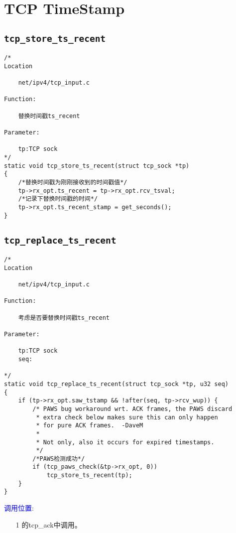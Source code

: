 \section{TCP TimeStamp}
    \subsection{\texttt{tcp_store_ts_recent}}
\begin{verbatim}
/*
Location

    net/ipv4/tcp_input.c

Function:

    替换时间戳ts_recent

Parameter:

    tp:TCP sock
*/
static void tcp_store_ts_recent(struct tcp_sock *tp)
{
    /*替换时间戳为刚刚接收到的时间戳值*/
    tp->rx_opt.ts_recent = tp->rx_opt.rcv_tsval;
    /*记录下替换时间戳的时间*/
    tp->rx_opt.ts_recent_stamp = get_seconds();
}
\end{verbatim}
    \subsection{\texttt{tcp_replace_ts_recent}}
        \label{TCPTimestamp:tcp_replace_ts_recent}
\begin{verbatim}
/*
Location

    net/ipv4/tcp_input.c

Function:

    考虑是否要替换时间戳ts_recent

Parameter:

    tp:TCP sock
    seq:

*/
static void tcp_replace_ts_recent(struct tcp_sock *tp, u32 seq)
{
    if (tp->rx_opt.saw_tstamp && !after(seq, tp->rcv_wup)) {
        /* PAWS bug workaround wrt. ACK frames, the PAWS discard
         * extra check below makes sure this can only happen
         * for pure ACK frames.  -DaveM
         *
         * Not only, also it occurs for expired timestamps.
         */
        /*PAWS检测成功*/
        if (tcp_paws_check(&tp->rx_opt, 0))
            tcp_store_ts_recent(tp);
    }
}
\end{verbatim}

        \textcolor{blue}{调用位置}:
            \begin{enumerate}
                \item[1]        \label{ClientReceiveSYN+ACK:tcp_ack}的tcp\_ack中调用。
            \end{enumerate}

